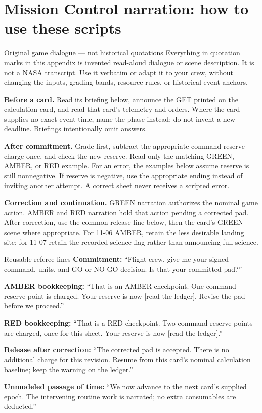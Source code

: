 \section*{Mission Control narration: how to use these scripts}
\label{narration-start}
\begin{panel}{Original game dialogue --- not historical quotations}
Everything in quotation marks in this appendix is invented read-aloud
dialogue or scene description. It is not a NASA transcript.
Use it verbatim or adapt it to your crew, without changing the inputs,
grading bands, resource rules, or historical event anchors.
\end{panel}

\textbf{Before a card.} Read its briefing below, announce the GET
printed on the calculation card, and read that card's telemetry and orders.
Where the card supplies no exact event time, name the phase instead;
do not invent a new deadline. Briefings intentionally omit answers.

\textbf{After commitment.} Grade first, subtract the appropriate
command-reserve charge once, and check the new reserve.
Read only the matching GREEN, AMBER, or RED example.
For an error, the examples below assume reserve is still nonnegative.
If reserve is negative, use the appropriate ending instead of inviting
another attempt. A correct sheet never receives a scripted error.

\textbf{Correction and continuation.} GREEN narration authorizes the
nominal game action. AMBER and RED narration hold that action pending a
corrected pad. After correction, use the common release line below,
then the card's GREEN scene where appropriate. For 11-06 AMBER, retain
the less desirable landing site; for 11-07 retain the recorded science
flag rather than announcing full science.

\begin{panel}{Reusable referee lines}
\textbf{Commitment:} ``Flight crew, give me your signed command,
units, and GO or NO-GO decision. Is that your committed pad?''

\textbf{AMBER bookkeeping:} ``That is an AMBER checkpoint.
One command-reserve point is charged. Your reserve is now
[read the ledger]. Revise the pad before we proceed.''

\textbf{RED bookkeeping:} ``That is a RED checkpoint.
Two command-reserve points are charged, once for this sheet.
Your reserve is now [read the ledger].''

\textbf{Release after correction:} ``The corrected pad is accepted.
There is no additional charge for this revision. Resume from this
card's nominal calculation baseline; keep the warning on the ledger.''

\textbf{Unmodeled passage of time:} ``We now advance to the next
card's supplied epoch. The intervening routine work is narrated;
no extra consumables are deducted.''
\end{panel}

